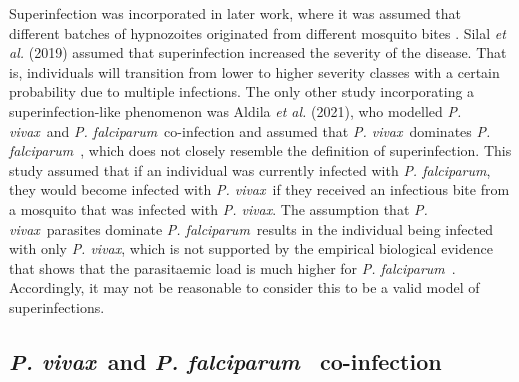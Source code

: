 \documentclass[12pt]{article}
\newcommand{\pv}{\textit{P. vivax}}
\newcommand{\pf}{\textit{P. falciparum}}
\newcommand{\etal}{\textit{et al. }}
\begin{document}
Superinfection was incorporated in later work, where it was assumed that different batches of hypnozoites originated from different mosquito bites \cite{white2018mathematical,huber2021radical,white2022potential,obadia2022developing}. Silal \etal(2019) \cite{silal2019malaria} assumed that superinfection increased the severity of the disease. That is, individuals will transition from lower to higher severity classes with a certain probability due to multiple infections. The only other study incorporating a superinfection-like phenomenon was Aldila \etal(2021), who modelled \pv~and \pf~co-infection and assumed that \pv~dominates \pf~\cite{aldila2021superinfection}, which does not closely resemble the definition of superinfection. This study assumed that if an individual was currently infected with \pf, they would become infected with \pv~if they received an infectious bite from a mosquito that was infected with \pv. The assumption that \pv~parasites dominate \pf~results in the individual being infected with only \pv, which is not supported by the empirical biological evidence that shows that the parasitaemic load is much higher for \pf~\cite{battle2021global}. Accordingly, it may not be reasonable to consider this to be a valid model of superinfections.


\subsection{\pv~and \pf~ co-infection}
\end{document}
